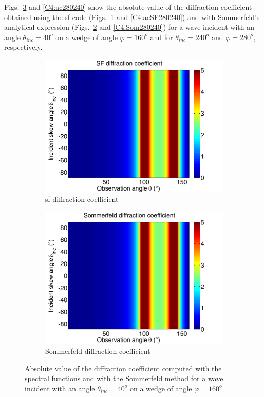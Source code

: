 Figs.~\ref{C4:ac16040} and \ref{C4:ac280240} show the absolute value of the diffraction coefficient obtained using the \acrshort{sf} code (Figs.~\ref{C4:acSF16040} and \ref{C4:acSF280240}) and with Sommerfeld's analytical expression (Figs.~\ref{C4:Som16040} and \ref{C4:Som280240}) for a wave incident with an angle $\theta_{inc}=40^o$ on a wedge of angle $\varphi=160^o$ and for $\theta_{inc}=240^o$ and $\varphi=280^o$, respectively. 

\begin{figure}[h]
\centering
\begin{subfigure}[b]{0.49\textwidth}
        \includegraphics[width=\textwidth]{images/chapter4/Xprop_160_40.png}
        \caption{\acrshort{sf} diffraction coefficient}
        \label{C4:acSF16040}
    \end{subfigure}
\begin{subfigure}[b]{0.49\textwidth}
        \includegraphics[width=\textwidth]{images/chapter4/Sommerfeld_160_40.png}
        \caption{Sommerfeld diffraction coefficient}
        \label{C4:Som16040}
    \end{subfigure}
\caption{Absolute value of the diffraction coefficient computed with the spectral functions and with the Sommerfeld method for a wave incident with an angle $\theta_{inc}=40^o$ on a wedge of angle $\varphi=160^o$}
\label{C4:ac16040}
\end{figure}


